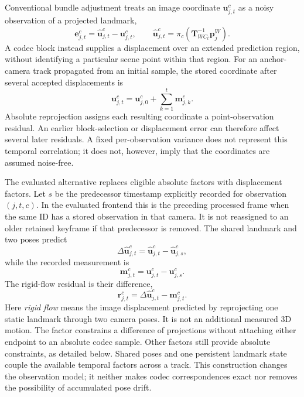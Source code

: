 Conventional bundle adjustment treats an image coordinate
$\mathbf{u}_{j,t}^{c}$ as a noisy observation of a projected landmark,
\begin{equation}
  \mathbf{e}_{j,t}^{c}
  = \widehat{\mathbf{u}}_{j,t}^{c}-\mathbf{u}_{j,t}^{c},
  \qquad
  \widehat{\mathbf{u}}_{j,t}^{c}
  = \pi_c\!\left(\mathbf{T}_{WC_t}^{-1}\mathbf{p}_j^W\right).
\end{equation}
A codec block instead supplies a displacement over an extended prediction
region, without identifying a particular scene point within that region.
For an anchor-camera track propagated from an initial sample, the stored
coordinate after several accepted displacements is
\begin{equation}
  \mathbf{u}_{j,t}^{c}
  = \mathbf{u}_{j,0}^{c}+\sum_{k=1}^{t}\mathbf{m}_{j,k}^{c}.
\end{equation}
Absolute reprojection assigns each resulting coordinate a point-observation
residual. An earlier block-selection or displacement error can therefore affect
several later residuals. A fixed per-observation variance does not represent
this temporal correlation; it does not, however, imply that the coordinates
are assumed noise-free.

The evaluated alternative replaces eligible absolute factors with displacement
factors. Let $s$ be the predecessor timestamp explicitly recorded for
observation $(j,t,c)$. In the evaluated frontend this is the preceding processed
frame when the same ID has a stored observation in that camera. It is not
reassigned to an older retained keyframe if that predecessor is removed.
The shared landmark and two poses predict
\begin{equation}
  \Delta\widehat{\mathbf{u}}_{j,t}^{c}
  = \widehat{\mathbf{u}}_{j,t}^{c}
    -\widehat{\mathbf{u}}_{j,s}^{c},
\end{equation}
while the recorded measurement is
\begin{equation}
  \mathbf{m}_{j,t}^{c}
  = \mathbf{u}_{j,t}^{c}-\mathbf{u}_{j,s}^{c}.
\end{equation}
The rigid-flow residual is their difference,
\begin{equation}
  \mathbf{r}_{j,t}^{c}
  = \Delta\widehat{\mathbf{u}}_{j,t}^{c}-\mathbf{m}_{j,t}^{c}.
  \label{eq:rigid-flow-residual}
\end{equation}
Here \emph{rigid flow} means the image displacement predicted by reprojecting
one static landmark through two camera poses. It is not an additional measured
3D motion. The factor constrains a difference of projections without attaching
either endpoint to an absolute codec sample. Other factors still provide
absolute constraints, as detailed below. Shared poses and one persistent
landmark state couple the available temporal factors across a track.
This construction changes the observation model; it neither makes codec
correspondences exact nor removes the possibility of accumulated pose drift.

